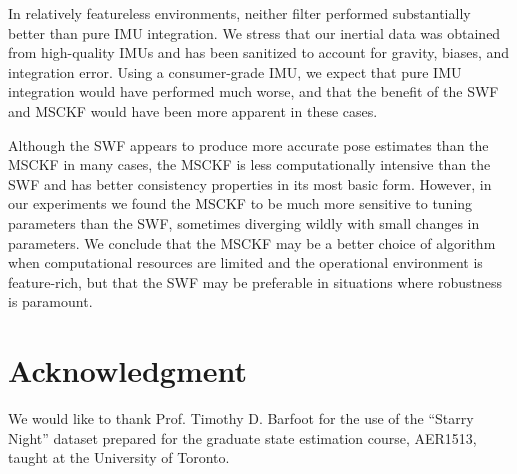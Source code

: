 \documentclass[letterpaper, 10 pt, conference]{ieeeconf}  %
\begin{document}
In relatively featureless environments, neither filter performed substantially better than pure IMU integration.
We stress that our inertial data was obtained from high-quality IMUs and has been sanitized to account for gravity, biases, and integration error.
Using a consumer-grade IMU, we expect that pure IMU integration would have performed much worse, and that the benefit of the SWF and MSCKF would have been more apparent in these cases.

Although the SWF appears to produce more accurate pose estimates than the MSCKF in many cases, the MSCKF is less computationally intensive than the SWF and has better consistency properties in its most basic form.
However, in our experiments we found the MSCKF to be much more sensitive to tuning parameters than the SWF, sometimes diverging wildly with small changes in parameters.
We conclude that the MSCKF may be a better choice of algorithm when computational resources are limited and the operational environment is feature-rich, but that the SWF may be preferable in situations where robustness is paramount.

\section*{Acknowledgment}
\noindent
\small{We would like to thank Prof. Timothy D. Barfoot for the use of the ``Starry Night'' dataset prepared for the graduate state estimation course, AER1513, taught at the University of Toronto.}

\def\url#1{} %


\end{document}
